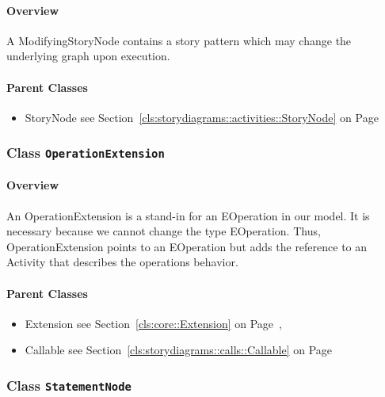 \paragraph{Overview}

	
			
A ModifyingStoryNode contains a story pattern which may change the underlying graph upon execution.	
		
	



\paragraph{Parent Classes}
\begin{itemize}
\item StoryNode see Section~\ref{cls:storydiagrams::activities::StoryNode} on Page~\pageref{cls:storydiagrams::activities::StoryNode}\end{itemize}
\subsubsection{\Large{Class \bfseries \texttt{OperationExtension}\normalfont}}
\label{cls:storydiagrams::activities::OperationExtension} 
\paragraph{Overview}

	
			
An OperationExtension is a stand-in for an EOperation in our model. It is necessary because we cannot change the type EOperation. Thus, OperationExtension points to an EOperation but adds the reference to an Activity that describes the operations behavior.	
		
	



\paragraph{Parent Classes}
\begin{itemize}
\item Extension see Section~\ref{cls:core::Extension} on Page~\pageref{cls:core::Extension}, \item Callable see Section~\ref{cls:storydiagrams::calls::Callable} on Page~\pageref{cls:storydiagrams::calls::Callable}\end{itemize}
\subsubsection{\Large{Class \bfseries \texttt{StatementNode}\normalfont}}
\label{cls:storydiagrams::activities::StatementNode} 
